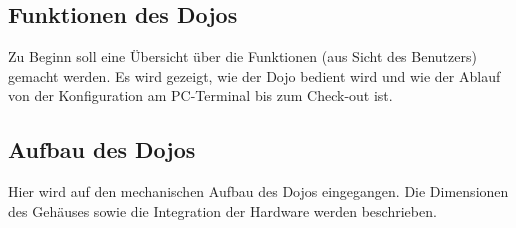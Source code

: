 
\subsection{Funktionen des Dojos}
Zu Beginn soll eine Übersicht über die Funktionen (aus Sicht des Benutzers) gemacht werden. Es wird gezeigt, wie der Dojo bedient wird und wie der Ablauf von der Konfiguration am PC-Terminal bis zum Check-out ist.

\subsection{Aufbau des Dojos}
Hier wird auf den mechanischen Aufbau des Dojos eingegangen. Die Dimensionen des Gehäuses sowie die Integration der Hardware werden beschrieben.
